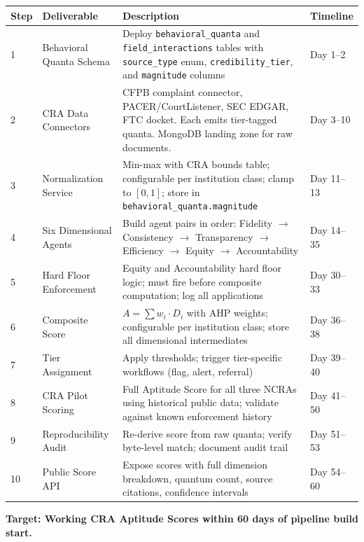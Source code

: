 \documentclass[a4paper,11pt]{article}
\begin{document}
	\begin{center}
		\begin{tabular}{C{0.8cm} L{3.5cm} L{7.8cm} C{1.7cm}}
			\toprule
			\color{white}\textbf{\sffamily Step} & \color{white}\textbf{\sffamily Deliverable} & \color{white}\textbf{\sffamily Description} & \color{white}\textbf{\sffamily Timeline} \\
			 & Behavioral Quanta Schema & Deploy \texttt{behavioral\_quanta} and \texttt{field\_interactions} tables with \texttt{source\_type} enum, \texttt{credibility\_tier}, and \texttt{magnitude} columns & Day 1--2 \\
			2 & CRA Data Connectors & CFPB complaint connector, PACER/CourtListener, SEC EDGAR, FTC docket. Each emits tier-tagged quanta. MongoDB landing zone for raw documents. & Day 3--10 \\
			3 & Normalization Service & Min-max with CRA bounds table; configurable per institution class; clamp to $[0,1]$; store in \texttt{behavioral\_quanta.magnitude} & Day 11--13 \\
			4 & Six Dimensional Agents & Build agent pairs in order: Fidelity $\to$ Consistency $\to$ Transparency $\to$ Efficiency $\to$ Equity $\to$ Accountability & Day 14--35 \\
			5 & Hard Floor Enforcement & Equity and Accountability hard floor logic; must fire before composite computation; log all applications & Day 30--33 \\
			6 & Composite Score & $A = \sum w_i \cdot D_i$ with AHP weights; configurable per institution class; store all dimensional intermediates & Day 36--38 \\
			7 & Tier Assignment & Apply thresholds; trigger tier-specific workflows (flag, alert, referral) & Day 39--40 \\
			8 & CRA Pilot Scoring & Full Aptitude Score for all three NCRAs using historical public data; validate against known enforcement history & Day 41--50 \\
			9 & Reproducibility Audit & Re-derive score from raw quanta; verify byte-level match; document audit trail & Day 51--53 \\
			10 & Public Score API & Expose scores with full dimension breakdown, quantum count, source citations, confidence intervals & Day 54--60 \\
			\bottomrule
		\end{tabular}
	\end{center}
	
	\bigskip
	\begin{mdframed}[linecolor=aptgreen,linewidth=2pt,backgroundcolor=aptgreen!5]
		\centering\textbf{\sffamily\color{aptgreen} Target: Working CRA Aptitude Scores within 60 days of pipeline build start.}
	\end{mdframed}
	
\end{document}
